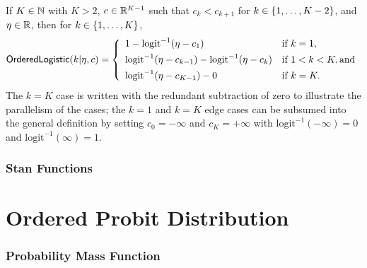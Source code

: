If $K \in \mathbb{N}$ with $K > 2$, $c \in \mathbb{R}^{K-1}$ such that $c_k <
c_{k+1}$ for $k \in \{ 1,\ldots,K-2 \}$, and $\eta \in \mathbb{R}$, then for $k \in
\{ 1,\ldots,K \}$,
\[
\mbox{\sf OrderedLogistic}(k|\eta,c)
=
\left\{
\begin{array}{ll}
1 - \mbox{logit}^{-1}(\eta - c_1) & \mbox{if } k = 1,
\\[4pt]
\mbox{logit}^{-1}(\eta - c_{k-1}) - \mbox{logit}^{-1}(\eta -
c_{k})

& \mbox{if } 1 < k < K, \mbox{and}
\\[4pt]
\mbox{logit}^{-1}(\eta - c_{K-1}) - 0
& \mbox{if } k = K.
\end{array}
\right.
\]
%
The $k=K$ case is written with the redundant subtraction of zero to
illustrate the parallelism of the cases; the $k=1$ and $k=K$ edge
cases can be subsumed into the general definition by setting $c_0 =
-\infty$ and $c_K = +\infty$ with $\mbox{logit}^{-1}(-\infty) = 0$ and
$\mbox{logit}^{-1}(\infty) = 1$.



\subsubsection{Stan Functions}

\begin{description}

\end{description}

\section{Ordered Probit Distribution}

\subsubsection{Probability Mass Function}

